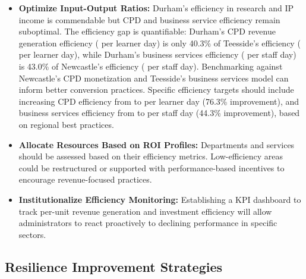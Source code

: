 \documentclass[journal,onecolumn, 10pt,draftclsnofoot]{IEEEtran}
\begin{document}
\begin{itemize}
    \item \textbf{Optimize Input-Output Ratios:} Durham's efficiency in research and IP income is commendable but CPD and business service efficiency remain suboptimal. The efficiency gap is quantifiable: Durham's CPD revenue generation efficiency ( per learner day) is only 40.3\% of Teesside's efficiency ( per learner day), while Durham's business services efficiency ( per staff day) is 43.0\% of Newcastle's efficiency ( per staff day). Benchmarking against Newcastle's CPD monetization and Teesside's business services model can inform better conversion practices. Specific efficiency targets should include increasing CPD efficiency from  to  per learner day (76.3\% improvement), and business services efficiency from  to  per staff day (44.3\% improvement), based on regional best practices.
    
    \item \textbf{Allocate Resources Based on ROI Profiles:} Departments and services should be assessed based on their efficiency metrics. Low-efficiency areas could be restructured or supported with performance-based incentives to encourage revenue-focused practices.
    
    \item \textbf{Institutionalize Efficiency Monitoring:} Establishing a KPI dashboard to track per-unit revenue generation and investment efficiency will allow administrators to react proactively to declining performance in specific sectors.
\end{itemize}

\subsection{Resilience Improvement Strategies}
\end{document}
